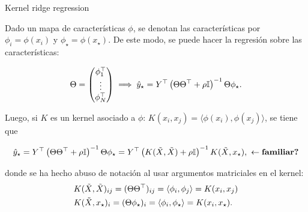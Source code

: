 \documentclass[9pt, handout]{beamer}
\begin{document}
\begin{frame}{Kernel ridge regression}

Dado un mapa de características $\phi$, se denotan las características por $\phi_i=\phi(x_i)$ y $\phi_\star = \phi(x_\star)$. De este modo, se puede hacer la regresión sobre las características:

\begin{equation*}
	\Theta=\left(\begin{matrix}
		\phi_1^\top\\
		\vdots\\
		\phi_N^\top
	\end{matrix}\right) \implies \hat{y}_\star = Y^\top \left(\Theta\Theta^\top + \rho{\mathbb I}\right)^{-1}\Theta \phi_\star.
\end{equation*}\pause

Luego, si $K$ es un kernel asociado a $\phi$: $K(x_i,x_j)=\langle\phi(x_i),\phi(x_j)\rangle$, se tiene que


\begin{equation*}
    \hat{y}_\star = Y^\top \left(\Theta\Theta^\top + \rho\eye\right)^{-1}\Theta \phi_\star  = Y^\top \left(K(\tX,\tX) + \rho\eye\right) ^{-1} K(\tX, x_\star),    \ \leftarrow\text{\bf familiar?}
\end{equation*}

donde se ha hecho abuso de notación al usar argumentos matriciales en el kernel:
\begin{align*}
	&K(\tilde{X},\tilde{X})_{ij} = (\Theta\Theta^\top)_{ij} = \langle\phi_i,\phi_j\rangle = K(x_i,x_j)\\
	& K(\tilde{X},x_\star)_i = (\Theta\phi_\star)_i = \langle\phi_i,\phi_\star\rangle = K(x_i,x_\star).
\end{align*}
	
\end{frame}
\end{document}
